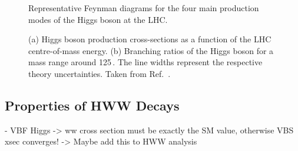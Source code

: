 \begin{figure}
{}
\quad
{}
\caption{Representative Feynman diagrams for the four main production modes of the Higgs boson at the LHC.}
\label{fig:higgsprodfeyn}
\end{figure}
\captionsetup[subfloat]{captionskip=5pt} %




\captionsetup[subfloat]{captionskip=5pt} %
\begin{figure}
  \begin{center}
  \end{center}
  \caption[(a) Higgs boson production cross-sections as a function of the LHC centre-of-mass energy. (b) Branching ratios of the Higgs boson for a mass range around 125\,\GeV.]{(a) Higgs boson production cross-sections as a function of the LHC centre-of-mass energy. (b) Branching ratios of the Higgs boson for a mass range around 125\,\GeV. The line widths represent the respective theory uncertainties. Taken from Ref.~\cite{YR4}.}
\end{figure}






\subsection{Properties of HWW Decays}
- VBF Higgs -> ww cross section must be exactly the SM value, otherwise VBS xsec converges!
-> Maybe add this to HWW analysis



